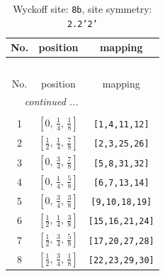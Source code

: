 \documentclass[fleqn,8pt]{jsarticle}
\begin{document}
\begin{longtable}{ccc}
\caption{Wyckoff site: {\tt 8b}, site symmetry: {\tt 2.2'2'}}
 \\
 \hline \hline
No. & position & mapping \\ \hline \endfirsthead

\multicolumn{2}{l}{\tablename\ \thetable{}} \\
 \hline \hline
No. & position & mapping \\ \hline \endhead

 \hline \hline
\multicolumn{2}{r}{\footnotesize\it continued ...} \\ \endfoot

 \hline \hline
\multicolumn{2}{r}{} \\ \endlastfoot

1 & $\left[ 0,\, \frac{1}{4},\, \frac{1}{8} \right]$ & {\tt [1,4,11,12]} \\ \hline
2 & $\left[ \frac{1}{2},\, \frac{1}{4},\, \frac{7}{8} \right]$ & {\tt [2,3,25,26]} \\ \hline
3 & $\left[ 0,\, \frac{3}{4},\, \frac{7}{8} \right]$ & {\tt [5,8,31,32]} \\ \hline
4 & $\left[ 0,\, \frac{1}{4},\, \frac{5}{8} \right]$ & {\tt [6,7,13,14]} \\ \hline
5 & $\left[ 0,\, \frac{3}{4},\, \frac{3}{8} \right]$ & {\tt [9,10,18,19]} \\ \hline
6 & $\left[ \frac{1}{2},\, \frac{1}{4},\, \frac{3}{8} \right]$ & {\tt [15,16,21,24]} \\ \hline
7 & $\left[ \frac{1}{2},\, \frac{3}{4},\, \frac{5}{8} \right]$ & {\tt [17,20,27,28]} \\ \hline
8 & $\left[ \frac{1}{2},\, \frac{3}{4},\, \frac{1}{8} \right]$ & {\tt [22,23,29,30]} \\
\end{longtable}
\renewcommand{\arraystretch}{1.2}
\end{document}
